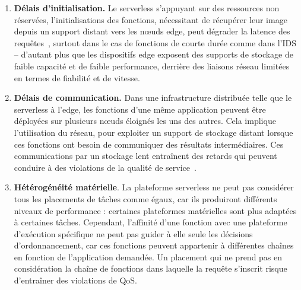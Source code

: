 \begin{enumerate}
    \item \textbf{Délais d'initialisation.} Le serverless s'appuyant sur des ressources non réservées, l'initialisations des fonctions, nécessitant de récupérer leur image depuis un support distant vers les nœuds edge, peut dégrader la latence des requêtes~\cite{yanHermesEfficientCache2020}, surtout dans le cas de fonctions de courte durée comme dans l'IDS -- d'autant plus que les dispositifs edge exposent des supports de stockage de faible capacité et de faible performance, derrière des liaisons réseau limitées en termes de fiabilité et de vitesse.
    \item \textbf{Délais de communication.} Dans une infrastructure distribuée telle que le serverless à l'edge, les fonctions d'une même application peuvent être déployées sur plusieurs nœuds éloignés les uns des autres. Cela implique l'utilisation du réseau, pour exploiter un support de stockage distant lorsque ces fonctions ont besoin de communiquer des résultats intermédiaires. Ces communications par un stockage lent entraînent des retards qui peuvent conduire à des violations de la qualité de service~\cite{wawrzoniakBoxerDataAnalytics2021a}.
    \item \textbf{Hétérogénéité matérielle}. La plateforme serverless ne peut pas considérer tous les placements de tâches comme égaux, car ils produiront différents niveaux de performance : certaines plateformes matérielles sont plus adaptées à certaines tâches. Cependant, l'affinité d'une fonction avec une plateforme d'exécution spécifique ne peut pas guider à elle seule les décisions d'ordonnancement, car ces fonctions peuvent appartenir à différentes chaînes en fonction de l'application demandée. Un placement qui ne prend pas en considération la chaîne de fonctions dans laquelle la requête s'inscrit risque d'entraîner des violations de \gls{QoS}.
\end{enumerate}

